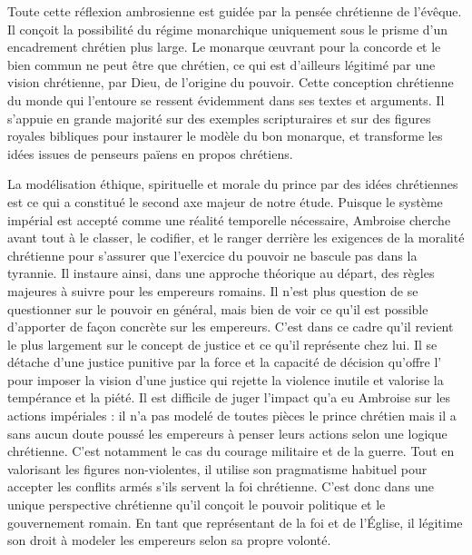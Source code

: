 \bigskip

Toute cette réflexion ambrosienne est guidée par la pensée chrétienne de l'évêque. Il conçoit la possibilité du régime monarchique uniquement sous le prisme d'un encadrement chrétien plus large. Le monarque œuvrant pour la concorde et le bien commun ne peut être que chrétien, ce qui est d'ailleurs légitimé par une vision chrétienne, par Dieu, de l'origine du pouvoir. Cette conception chrétienne du monde qui l'entoure se ressent évidemment dans ses textes et arguments. Il s'appuie en grande majorité sur des exemples scripturaires et sur des figures royales bibliques pour instaurer le modèle du bon monarque, et transforme les idées issues de penseurs païens en propos chrétiens.

\bigskip

La modélisation éthique, spirituelle et morale du prince par des idées chrétiennes est ce qui a constitué le second axe majeur de notre étude. Puisque le système impérial est accepté comme une réalité temporelle nécessaire, Ambroise cherche avant tout à le classer, le codifier, et le ranger derrière les exigences de la moralité chrétienne pour s'assurer que l'exercice du pouvoir ne bascule pas dans la tyrannie. Il instaure ainsi, dans une approche théorique au départ, des règles majeures à suivre pour les empereurs romains. Il n'est plus question de se questionner sur le pouvoir en général, mais bien de voir ce qu'il est possible d'apporter de façon concrète sur les empereurs. C'est dans ce cadre qu'il revient le plus largement sur le concept de justice et ce qu'il représente chez lui. Il se détache d'une justice punitive par la force et la capacité de décision qu'offre l' pour imposer la vision d'une justice qui rejette la violence inutile et valorise la tempérance et la piété. Il est difficile de juger l'impact qu'a eu Ambroise sur les actions impériales : il n'a pas modelé de toutes pièces le prince chrétien mais il a sans aucun doute poussé les empereurs à penser leurs actions selon une logique chrétienne. C'est notamment le cas du courage militaire et de la guerre. Tout en valorisant les figures non-violentes, il utilise son pragmatisme habituel pour accepter les conflits armés s'ils servent la foi chrétienne. C'est donc dans une unique perspective chrétienne qu'il conçoit le pouvoir politique et le gouvernement romain. En tant que représentant de la foi et de l'Église, il légitime son droit à modeler les empereurs selon sa propre volonté.

\bigskip

